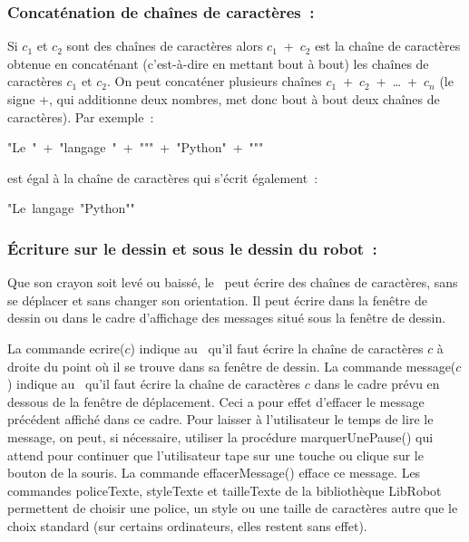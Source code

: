 \subsubsection{Concaténation de chaînes de caractères~:}
Si $c_{1}$ et $c_{2}$ sont des chaînes de
caractères alors $c_{1}$\ {\idt +}\ $c_{2}$ est la chaîne de
caractères obtenue en concaténant (c'est-à-dire en mettant bout à bout) les chaînes de
caractères $c_{1}$ et $c_{2}$. On peut concaténer plusieurs chaînes
$c_{1}$\ {\idt +}\ $c_{2}$\ {\idt +}\ \ldots\ {\idt +}\ $c_{n}$ (le signe {\idt +}, qui
additionne deux nombres, met donc bout à bout deux chaînes de caractères). Par exemple~:
\begin{center}
{\cha "Le\ "}\ {\idt +}\ {\cha "langage\ "}\ {\idt +}\ {\cha """}\
{\idt +}\ {\cha "Python"}\ {\idt +}\ {\cha """}
\end{center}
est égal à la chaîne de caractères qui s'écrit également~:
\begin{center}
{\cha "Le\ langage\ "Python""}
\end{center}

\subsubsection{Écriture sur le dessin et sous le dessin du robot~:}
Que son crayon soit levé ou baissé, le \robot\ peut écrire des chaînes de ca\-rac\-tè\-res,
sans se déplacer et sans changer son orientation. Il peut écrire dans la fenêtre de dessin ou dans le cadre d'affichage des
messages situé sous la fenêtre de dessin.

La commande {\idt ecrire($c$)} indique au \robot\ qu'il faut écrire la chaîne de caractères $c$ à droite du point
où il se trouve dans sa fenêtre de dessin.
La commande {\idt message($c$)} indique au \robot\ qu'il faut écrire la chaîne de ca\-rac\-tè\-res $c$ dans le
cadre prévu en dessous de la fenêtre de déplacement. Ceci a pour effet d'effacer le message précédent
affiché dans ce
cadre. Pour laisser à l'utilisateur le temps de lire le message, on peut, si nécessaire, utiliser la procédure
{\idt marquerUnePause()} qui attend pour continuer que l'utilisateur tape sur une touche ou clique sur le bouton de la
souris. La commande {\idt effacerMessage()} efface ce message. Les commandes {\idt policeTexte},
{\idt styleTexte} et {\idt tailleTexte} de la bibliothèque {\idt LibRobot} permettent de choisir une police,
un style ou une taille de caractères autre que le choix standard (sur certains ordinateurs, elles restent
sans effet).

